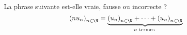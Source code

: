 La phrase suivante est-elle vraie, fausse ou incorrecte ?
  \[\left(nu_n \right)_{n\in\N}=\underbrace{\left(u_n \right)_{n\in\N}+\cdots+\left(u_n \right)_{n\in\N}}_{n\text{ termes }}\]